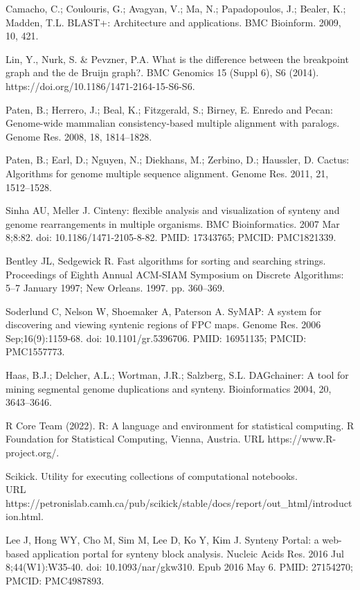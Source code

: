 \documentclass[12pt]{article}
\begin{document}
\begin{thebibliography}{99}
 Camacho, C.; Coulouris, G.; Avagyan, V.; Ma, N.;
Papadopoulos, J.; Bealer, K.; Madden, T.L. BLAST+: Architecture and
applications. BMC Bioinform. 2009, 10, 421.

 Lin, Y., Nurk, S. \& Pevzner, P.A. What is the difference
between the breakpoint graph and the de Bruijn graph?. BMC Genomics 15
(Suppl 6), S6 (2014). https://doi.org/10.1186/1471-2164-15-S6-S6.

 Paten, B.; Herrero, J.; Beal, K.; Fitzgerald, S.; Birney,
E. Enredo and Pecan: Genome-wide mammalian consistency-based multiple alignment
with paralogs. Genome Res. 2008, 18, 1814–1828.

 Paten, B.; Earl, D.; Nguyen, N.; Diekhans, M.; Zerbino, D.;
Haussler, D. Cactus: Algorithms for genome multiple sequence alignment.
Genome Res. 2011, 21, 1512–1528.

 Sinha AU, Meller J. Cinteny: flexible analysis and
visualization of synteny and genome rearrangements in multiple organisms.
BMC Bioinformatics. 2007 Mar 8;8:82. doi: 10.1186/1471-2105-8-82.
PMID: 17343765; PMCID: PMC1821339.

 Bentley JL, Sedgewick R. Fast algorithms for sorting and searching
strings. Proceedings of Eighth Annual ACM-SIAM Symposium on Discrete
Algorithms: 5–7 January 1997; New Orleans. 1997. pp. 360–369.

 Soderlund C, Nelson W, Shoemaker A, Paterson A. SyMAP: A system
for discovering and viewing syntenic regions of FPC maps. Genome Res. 2006
Sep;16(9):1159-68. doi: 10.1101/gr.5396706. PMID: 16951135; PMCID: PMC1557773.

 Haas, B.J.; Delcher, A.L.; Wortman, J.R.; Salzberg, S.L.
DAGchainer: A tool for mining segmental genome duplications and synteny.
Bioinformatics 2004, 20, 3643–3646.

 R Core Team (2022).
R: A language and environment for statistical computing. R Foundation
for Statistical Computing, Vienna, Austria. URL https://www.R-project.org/.

 Scikick. Utility for executing collections of computational
notebooks.\\
URL https://petronislab.camh.ca/pub/scikick/stable/docs/report/out\_html/introduction.html.

 Lee J, Hong WY, Cho M, Sim M, Lee D, Ko Y, Kim J. Synteny
Portal: a web-based application portal for synteny block analysis. Nucleic
Acids Res. 2016 Jul 8;44(W1):W35-40. doi: 10.1093/nar/gkw310. Epub 2016 May 6.
PMID: 27154270; PMCID: PMC4987893.


\end{thebibliography}
\end{document}
